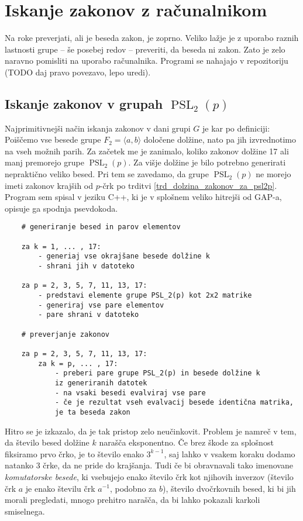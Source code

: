 \section{Iskanje zakonov z računalnikom}
\label{sec_racunalnisko_iskanje}

Na roke preverjati, ali je beseda zakon, je zoprno. Veliko lažje je z uporabo raznih lastnosti grupe -- še posebej redov -- preveriti, da beseda ni zakon. 
Zato je zelo naravno pomisliti na uporabo računalnika. %
Programi se nahajajo v repozitoriju (TODO daj pravo povezavo, lepo uredi).

\subsection{Iskanje zakonov v grupah $\operatorname{PSL}_2(p)$} %

Najprimitivnejši način iskanja zakonov v dani grupi $G$ je kar po definiciji: Poiščemo vse besede grupe $F_2 = \langle a,b \rangle$ določene dolžine, nato pa jih izvrednotimo na vseh možnih parih.
Za začetek me je zanimalo, koliko zakonov dolžine 17 ali manj premorejo grupe $\operatorname{PSL}_2(p)$. Za višje dolžine je bilo potrebno generirati nepraktično veliko besed. Pri tem se zavedamo, da grupe $\operatorname{PSL}_2(p)$ ne morejo imeti zakonov krajših od $p$-črk po trditvi \ref{trd_dolzina_zakonov_za_psl2p}.
Program sem spisal v jeziku C++, ki je v splošnem veliko hitrejši od GAP-a, opisuje ga spodnja psevdokoda.

\begin{verbatim}
    # generiranje besed in parov elementov

    za k = 1, ... , 17:
        - generiaj vse okrajšane besede dolžine k
        - shrani jih v datoteko
    
    za p = 2, 3, 5, 7, 11, 13, 17:
        - predstavi elemente grupe PSL_2(p) kot 2x2 matrike
        - generiraj vse pare elementov
        - pare shrani v datoteko

    # preverjanje zakonov
    
    za p = 2, 3, 5, 7, 11, 13, 17:
        za k = p, ... , 17:
            - preberi pare grupe PSL_2(p) in besede dolžine k 
            iz generiranih datotek
            - na vsaki besedi evalviraj vse pare
            - če je rezultat vseh evalvacij besede identična matrika,
            je ta beseda zakon
\end{verbatim}

Hitro se je izkazalo, da je tak pristop zelo neučinkovit. Problem je namreč v tem, da število besed dolžine $k$ narašča eksponentno. Če brez škode za splošnost fiksiramo prvo črko, je to število enako $3^{k - 1}$,
saj lahko v vsakem koraku dodamo natanko 3 črke, da ne pride do krajšanja. Tudi če bi obravnavali tako imenovane \emph{komutatorske besede}, ki vsebujejo enako število črk kot njihovih inverzov (število črk $a$ je enako številu črk $a^{-1}$, podobno za $b$),
število dvočrkovnih besed, ki bi jih morali pregledati, mnogo prehitro narašča, da bi lahko pokazali karkoli smiselnega.

